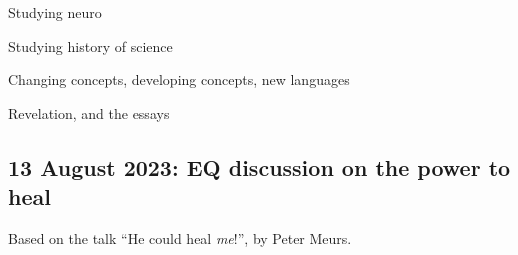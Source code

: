 \begin{compactitem}
			\item Studying neuro
			
			\item Studying history of science
				\begin{compactitem}
					\item Changing concepts, developing concepts, new languages
				\end{compactitem}
				
			\item Revelation, and the essays
			
		\end{compactitem}
		
	\subsection{13 August 2023: EQ discussion on the power to heal}
		\label{TALKS-13-08-2023}
		
		Based on the talk ``He could heal \textit{me}!'', by Peter Meurs.
		
